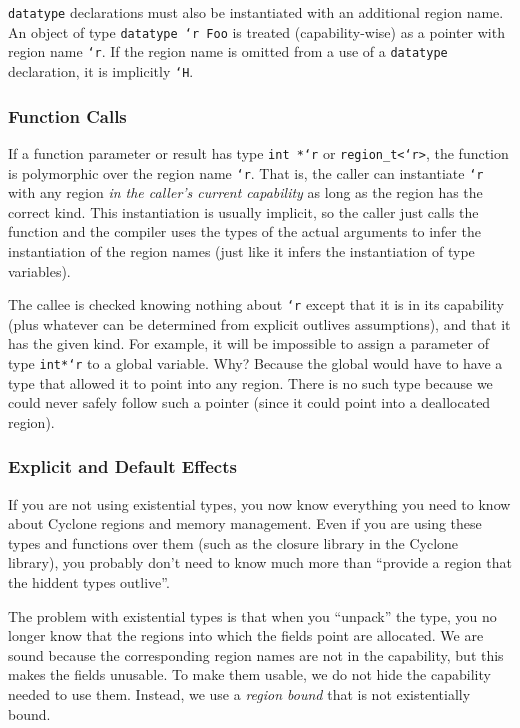 \texttt{datatype} declarations must also be
instantiated with an additional region name.  An object of type
\texttt{datatype `r Foo}
is treated (capability-wise) as a pointer with region name
\texttt{`r}.  If the region name is omitted from a use of a
\texttt{datatype} declaration, it is implicitly \texttt{`H}.

\subsubsection{Function Calls}

If a function parameter or result has type \texttt{int *`r} or
\texttt{region_t<`r>}, the function is polymorphic over the region name
\texttt{`r}.  That is, the caller can instantiate \texttt{`r} with any
region \emph{in the caller's current capability} as long as the region has
the correct kind. This instantiation is usually implicit, so the caller just
calls the function and the compiler uses the types of the actual arguments
to infer the instantiation of the region names (just like it infers the
instantiation of type variables).

The callee is checked knowing nothing about \texttt{`r} except that it is in
its capability (plus whatever can be determined from explicit outlives
assumptions), and that it has the given kind.  For example, it will be
impossible to assign a parameter of type \texttt{int*`r} to a global
variable.  Why?  Because the global would have to have a type that allowed
it to point into any region.  There is no such type because we could never
safely follow such a pointer (since it could point into a deallocated
region).

\subsubsection{Explicit and Default Effects}

If you are not using existential types, you now know everything you
need to know about Cyclone regions and memory management.  Even if you
are using these types and functions over them (such as the closure
library in the Cyclone library), you probably don't need to know much more
than ``provide a region that the hiddent types outlive''.

The problem with existential types is that when you ``unpack'' the
type, you no longer know that the regions into which the fields point
are allocated.  We are sound because the corresponding region names
are not in the capability, but this makes the fields unusable.  To
make them usable, we do not hide the capability needed to use them.
Instead, we use a \emph{region bound} that is not existentially
bound.  

